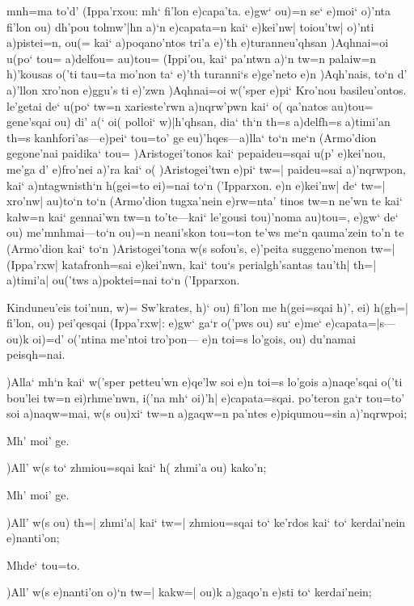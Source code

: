 \documentclass[11pt]{book}
\newcommand {\Spag} {\Npag*{=+1}\Npar{1}\numerus{1}}
\newcommand {\Spar} {\Npar*{=+1}\numerus{1}}
\begin{document}
\Spar %
\qquad  mnh=ma to'd' (Ippa'rxou: mh` fi'lon e)capa'ta. \hfil \break
e)gw` ou)=n se` e)moi` o)'nta fi'lon ou) dh'pou tolmw'|hn a)`n
e)capata=n kai` e)kei'nw| toiou'tw| o)'nti a)pistei=n, ou(= kai`
a)poqano'ntos tri'a e)'th e)turanneu'qhsan )Aqhnai=oi u(po` tou=
a)delfou= au)tou= (Ippi'ou, kai` pa'ntwn a)`n tw=n palaiw=n h)'kousas
o('ti tau=ta mo'non ta` e)'th turanni`s e)ge'neto e)n )Aqh'nais, to`n
d' a)'llon xro'non e)ggu's ti e)'zwn )Aqhnai=oi w('sper e)pi` Kro'nou
basileu'ontos. le'getai de` u(po` tw=n xarieste'rwn a)nqrw'pwn kai` o(
qa'natos au)tou=
\Spar %
 gene'sqai ou) di' a(` oi( polloi` w)|h'qhsan, dia` th`n th=s a)delfh=s
a)timi'an th=s kanhfori'as---e)pei` tou=to' ge eu)'hqes---a)lla` to`n me`n
(Armo'dion gegone'nai paidika` tou= )Aristogei'tonos kai` pepaideu=sqai u(p'
e)kei'nou, me'ga d' e)fro'nei a)'ra kai` o( )Aristogei'twn e)pi` tw=|
paideu=sai a)'nqrwpon, kai` a)ntagwnisth`n h(gei=to ei)=nai to`n ('Ipparxon.
e)n e)kei'nw| de` tw=| xro'nw| au)to`n to`n
\Spar %
 (Armo'dion tugxa'nein e)rw=nta' tinos tw=n ne'wn te kai` kalw=n kai`
gennai'wn tw=n to'te---kai` le'gousi tou)'noma au)tou=, e)gw` de` ou)
me'mnhmai---to`n ou)=n neani'skon tou=ton te'ws me`n qauma'zein to'n te
(Armo'dion kai` to`n )Aristogei'tona w(s sofou's, e)'peita suggeno'menon
tw=| (Ippa'rxw| katafronh=sai e)kei'nwn, kai` tou`s perialgh'santas tau'th|
th=| a)timi'a| ou('tws a)poktei=nai to`n ('Ipparxon.\par
\2 Kinduneu'eis toi'nun, w)= Sw'krates, h)` ou) fi'lon me h(gei=sqai h)', ei)
h(gh=| fi'lon, ou) pei'qesqai (Ippa'rxw|: e)gw` ga`r
\Spar %
 o('pws ou) su` e)me` e)capata=|s---ou)k oi)=d' o('ntina me'ntoi
tro'pon--- e)n toi=s lo'gois, ou) du'namai peisqh=nai.

\1 )Alla` mh`n kai` w('sper petteu'wn e)qe'lw soi e)n toi=s lo'gois a)naqe'sqai
o('ti bou'lei tw=n ei)rhme'nwn, i('na mh` oi)'h| e)capata=sqai. po'teron ga`r
tou=to' soi a)naqw=mai, w(s ou)xi` tw=n a)gaqw=n pa'ntes e)piqumou=sin
a)'nqrwpoi;

\2 Mh' moi' ge.

\1 )All' w(s to` zhmiou=sqai kai` h( zhmi'a ou) kako'n;

\2 Mh' moi' ge.

\1 )All' w(s ou) th=| zhmi'a| kai` tw=| zhmiou=sqai to` ke'rdos kai` to`
kerdai'nein e)nanti'on;

\2 \Spag Mhde` tou=to.

\1 )All' w(s e)nanti'on o)`n tw=| kakw=| ou)k a)gaqo'n e)sti to` kerdai'nein;
\end{document}
